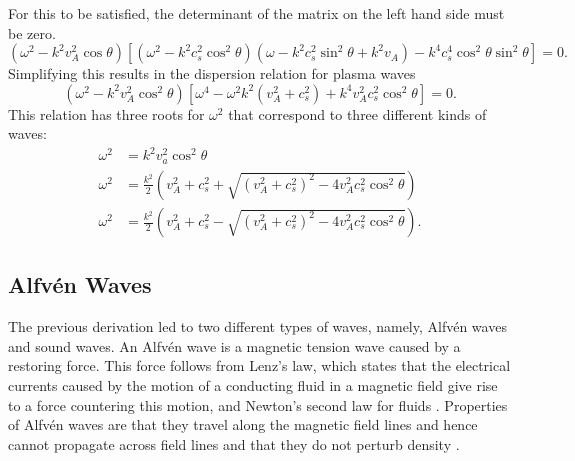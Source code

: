 \documentclass[a4paper]{article}
\numberwithin{figure}{section}
\numberwithin{equation}{section}
\begin{document}
For this to be satisfied, the determinant of the matrix on the left hand side must be zero. 
\[
	(\omega^2 - k^2v_A^2 \cos \theta)\left[ (\omega^2-k^2c_s^2 \cos^2 \theta)(\omega - k^2c_s^2 \sin^2 \theta + k^2 v_A) - k^4c_s^{4}\cos^2\theta \sin^2\theta   \right] = 0
.\] 
Simplifying this results in the dispersion relation for plasma waves
\begin{equation}\label{eq:disperion}
	(\omega^2 - k^2 v_A^2 \cos^2 \theta)\left[ \omega^{4} - \omega^2k^2(v_A^2 + c_s^2) + k^{4}v_A^2c_s^2\cos^2\theta \right]  = 0
.\end{equation} 
This relation has three roots for $\omega^2$ that correspond to three different kinds of waves:
\begin{align*}
	\omega^2 &=  k^2v_a^2\cos^2\theta \tag{Alfv\'en Waves} \\
	\omega^2 &= \frac{k^2}{2}\left( v_A^2 + c_s^2 + \sqrt{(v_A^2 + c_s^2)^2 - 4v_A^2c_s^2\cos^2\theta}  \right) \tag{Fast magnetosonic waves}\\
	\omega^2 &= \frac{k^2}{2}\left( v_A^2 + c_s^2 - \sqrt{(v_A^2 + c_s^2)^2 - 4v_A^2c_s^2\cos^2\theta}  \right) \tag{Slow magnetosonic waves}
.\end{align*}
\subsection{Alfv\'en Waves}
The previous derivation led to two different types of waves, namely, Alfv\'en waves and sound waves. An Alfv\'en wave is a magnetic tension wave caused by a restoring force. 
This force follows from Lenz's law, which states that the electrical currents caused by the motion of a conducting fluid in a magnetic field give rise to a force countering this motion, and Newton's second law for fluids \cite{Finlay2007}. 
Properties of Alfv\'en waves are that they travel along the magnetic field lines and hence cannot propagate across field lines and that they do not perturb density \cite{mhdppt}.\\
\end{document}
